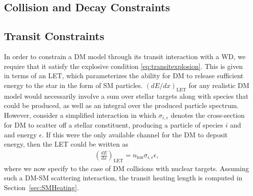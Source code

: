 \documentclass[preprintnumbers,amsmath,amssymb,prd, superscriptaddress,twocolumn]{revtex4}
\begin{document}
\subsection{Collision and Decay Constraints}
\label{sec:CollisionConstraints}


\subsection{Transit Constraints}
\label{sec:TransitConstraints}

In order to constrain a DM model through its transit interaction with a WD, we require that it satisfy the explosive condition \eqref{eq:transitexplosion}.
This is given in terms of an LET, which parameterizes the ability for DM to release sufficient energy to the star in the form of SM particles.
$(dE/dx)_\text{LET}$ for any realistic DM model would necessarily involve a sum over stellar targets along with species that could be produced, as well as an integral over the produced particle spectrum.
However, consider a simplified interaction in which $\sigma_{i,\epsilon}$ denotes the cross-section for DM to scatter off a stellar constituent, producing a particle of species $i$ and and energy $\epsilon$.
If this were the only available channel for the DM to deposit energy, then the LET could be written as
\begin{align}
\label{eq:schematicLET}
  \left( \frac{d E}{d x} \right)_\text{LET} = n_\text{ion} \sigma_{i,\epsilon} \epsilon,
\end{align}
where we now specify to the case of DM collisions with nuclear targets.
Assuming such a DM-SM scattering interaction, the transit heating length is computed in Section~\ref{sec:SMHeating}.
\end{document}
